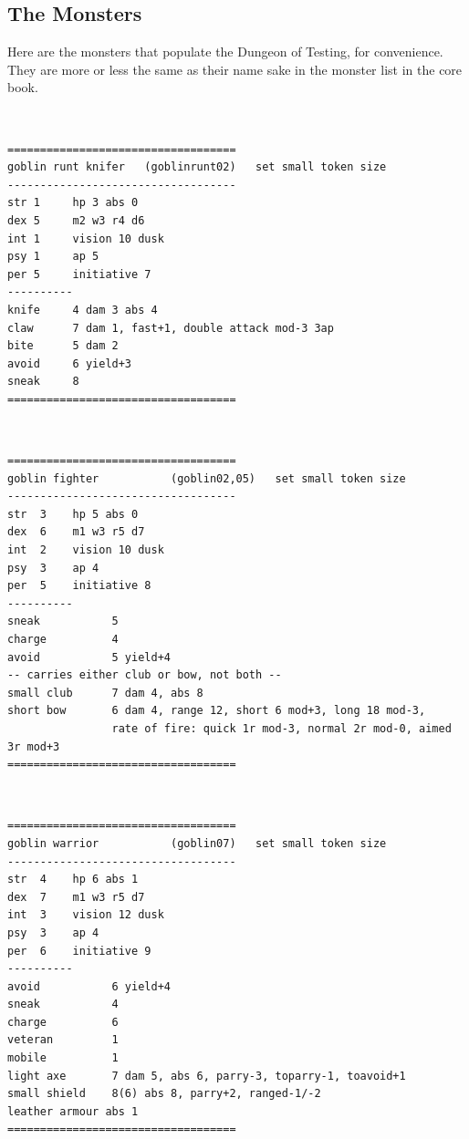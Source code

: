 

\subsection*{The Monsters}

Here are the monsters that populate the Dungeon of Testing, for convenience. They are more or less the same as their name sake in the monster list in the core book.

\

\goodbreak \begin{samepage} \small \begin{verbatim}
===================================
goblin runt knifer   (goblinrunt02)   set small token size
-----------------------------------
str 1     hp 3 abs 0
dex 5     m2 w3 r4 d6
int 1     vision 10 dusk
psy 1     ap 5
per 5     initiative 7
----------
knife     4 dam 3 abs 4
claw      7 dam 1, fast+1, double attack mod-3 3ap
bite      5 dam 2
avoid     6 yield+3
sneak     8
===================================
\end{verbatim} \normalsize \end{samepage}

\

\goodbreak \begin{samepage} \small \begin{verbatim}
===================================
goblin fighter           (goblin02,05)   set small token size
-----------------------------------
str  3    hp 5 abs 0
dex  6    m1 w3 r5 d7
int  2    vision 10 dusk
psy  3    ap 4
per  5    initiative 8
----------
sneak           5
charge          4
avoid           5 yield+4
-- carries either club or bow, not both --
small club      7 dam 4, abs 8
short bow       6 dam 4, range 12, short 6 mod+3, long 18 mod-3,
                rate of fire: quick 1r mod-3, normal 2r mod-0, aimed 3r mod+3
===================================
\end{verbatim} \normalsize \end{samepage}

\

\goodbreak \begin{samepage} \small \begin{verbatim}
===================================
goblin warrior           (goblin07)   set small token size
-----------------------------------
str  4    hp 6 abs 1
dex  7    m1 w3 r5 d7
int  3    vision 12 dusk
psy  3    ap 4
per  6    initiative 9
----------
avoid           6 yield+4
sneak           4
charge          6
veteran         1
mobile          1
light axe       7 dam 5, abs 6, parry-3, toparry-1, toavoid+1
small shield    8(6) abs 8, parry+2, ranged-1/-2
leather armour abs 1
===================================
\end{verbatim} \normalsize \end{samepage}

